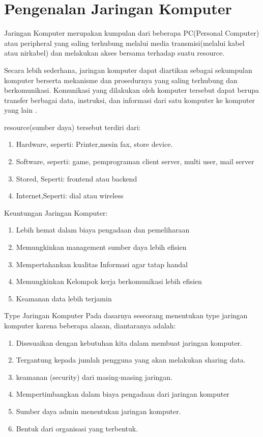 \section{Pengenalan Jaringan Komputer}
 Jaringan Komputer merupakan kumpulan dari beberapa PC(Personal Computer) atau peripheral yang saling terhubung melalui media transmisi(melalui kabel atau nirkabel) dan melakukan akses bersama  terhadap suatu resource.
 \par Secara lebih sederhana, jaringan komputer dapat diartikan sebagai sekumpulan komputer berserta mekanisme dan prosedurnya yang saling terhubung dan berkomunikasi.  Komunikasi yang dilakukan oleh komputer tersebut dapat berupa transfer berbagai data, instruksi, dan informasi dari satu komputer ke komputer yang lain \cite{irawan2012analisis}.

 resource(sumber daya) tersebut terdiri dari:
 \begin{enumerate}
   \item Hardware, seperti: Printer,mesin fax, store device.
   \item Software, seperti: game, pemprograman client server, multi user, mail server
   \item Stored, Seperti: frontend atau backend
   \item Internet,Seperti: dial atau wireless
 \end{enumerate}

Keuntungan Jaringan Komputer:
\begin{enumerate}
  \item Lebih hemat dalam biaya pengadaan dan pemeliharaan
  \item Memungkinkan management sumber daya lebih efisien
  \item Mempertahankan kualitas Informasi agar tatap handal
  \item Memungkinkan Kelompok kerja berkomunikasi lebih efisien
  \item Keamanan data lebih terjamin
\end{enumerate}

Type Jaringan Komputer
 Pada dasarnya seseorang menentukan type jaringan komputer karena beberapa alasan, diantaranya adalah:
 \begin{enumerate}
   \item Disesuaikan dengan kebutuhan kita dalam membuat jaringan komputer.
   \item Tergantung kepada jumlah pengguna yang akan melakukan sharing data.
   \item keamanan (security) dari masing-masing jaringan.
   \item Mempertimbangkan dalam biaya pengadaan dari jaringan komputer
   \item Sumber daya admin menentukan jaringan komputer.
   \item Bentuk dari organisasi yang terbentuk.
 \end{enumerate}

